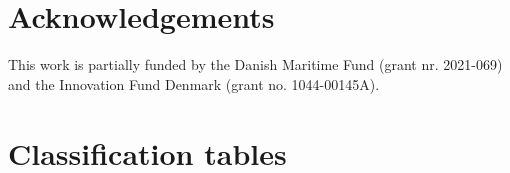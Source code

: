 \documentclass[preprint,12pt,authoryear]{elsarticle}
\begin{document}
\section*{Acknowledgements}
This work is partially funded by the Danish Maritime Fund (grant nr. 2021-069) and the Innovation Fund Denmark (grant no. 1044-00145A).

\clearpage
\appendix
\section{Classification tables}
\label{app:classification_tables}
\begin{table}[h!]
    \centering
    \caption{\label{tab:scheme}Classification scheme}
\end{table}
\end{document}
